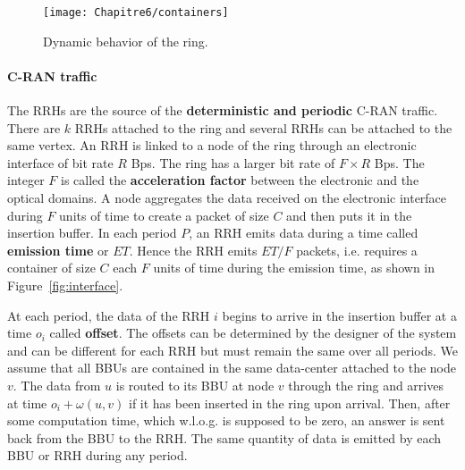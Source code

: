   
  \begin{figure}[h!]

        \begin{center}
   \texttt{[image: Chapitre6/containers]}
   
   
      \end{center} 

   
     \caption{Dynamic behavior of the ring.}\label{fig:containers}

  \end{figure}
  
     \paragraph{C-RAN traffic}
   
   The RRHs are the source of the {\bf deterministic and periodic} C-RAN traffic.
   There are $k$ RRHs attached to the ring and several RRHs can be attached to the same vertex. An RRH is linked to a node of the ring through an electronic interface of bit rate $R$ Bps.
   The ring has a larger bit rate of $F\times R$ Bps. The integer $F$ is called the {\bf acceleration factor} between the electronic and the optical domains. A node aggregates the data received on the electronic interface during $F$ units of time to create a packet of size $C$ and then puts it in the insertion buffer.
  In each period $P$, an RRH emits data during a time called \textbf{emission time} or $ET$. Hence the RRH emits $ET / F$ packets, i.e. requires a container of size $C$ each $F$ units of time during the emission time, as shown in Figure~\ref{fig:interface}.
   
   At each period, the data of the RRH $i$ begins to arrive in the insertion buffer at a time $o_i$  called {\bf offset}. The offsets can be determined by the designer of the system and can be different for each RRH but must remain the same over all periods. We assume that all BBUs are contained in the same data-center attached to the node $v$. The data from $u$ is routed to its BBU at node $v$ through the ring and arrives at time $o_i + \omega(u,v)$ if it has been inserted in the ring upon arrival. Then, after some computation time, which w.l.o.g. is supposed to be zero, an answer is sent back from the BBU to the RRH. The same quantity of data is emitted by each BBU or RRH during any period.
   
